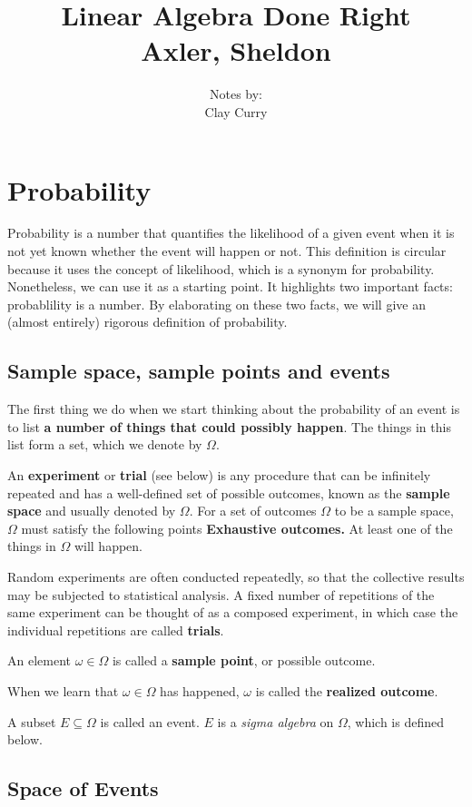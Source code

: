 \documentclass[11pt]{article} %
\title{Linear Algebra Done Right \\ Axler, Sheldon}
\author{Notes by:  \\ Clay Curry}
\date{}
\begin{document}
\section{Probability}
Probability is a number that quantifies the likelihood of a given event when it is not yet known whether the event will happen or not. This definition is circular because it uses the concept of likelihood, which is a synonym for probability. Nonetheless, we can use it as a starting point. It highlights two important facts:
{probablility is a number.}
\noindent
By elaborating on these two facts, we will give an (almost entirely) rigorous definition of probability. 

\subsection{Sample space, sample points and events}
\vspace{10 pt}

The first thing we do when we start thinking about the probability of an event is to list \textbf{a number of things that could possibly happen}. The things in this list form a set, which we denote by $\Omega$.

{An \textbf{experiment} or \textbf{trial} (see below) is any procedure that can be infinitely repeated and has a well-defined set of possible outcomes, known as the \textbf{sample space} and usually denoted by $\Omega$. For a set of outcomes $\Omega$ to be a sample space, $\Omega$ must satisfy the following points
{\textbf{Exhaustive outcomes.} \hspace{5 pt} At least one of the things in $\Omega$ will happen.}

}

Random experiments are often conducted repeatedly, so that the collective results may be subjected to statistical analysis. A fixed number of repetitions of the same experiment can be thought of as a composed experiment, in which case the individual repetitions are called \textbf{trials}. 

{An element $\omega \in \Omega$ is called a \textbf{sample point}, or possible outcome.}

{When we learn that $\omega \in \Omega$ has happened, $\omega$ is called the \textbf{realized outcome}.}

{A subset $E \subseteq \Omega$ is called an event. $E$ is a \textit{sigma algebra} on $\Omega$, which is defined below.}

\subsection{Space of Events}
\end{document}
